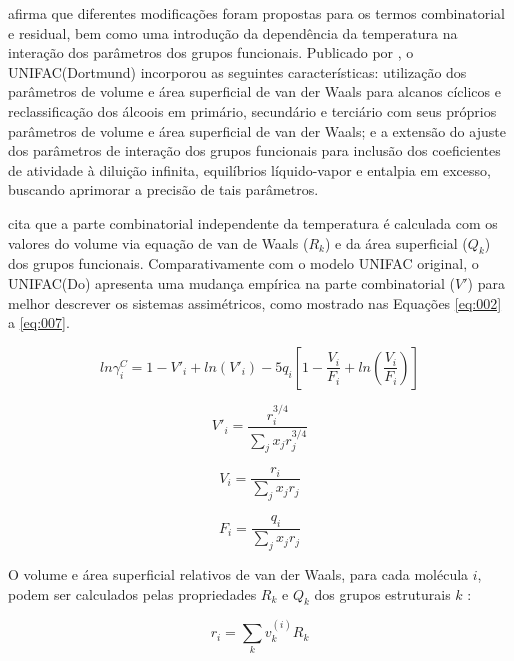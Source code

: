  afirma que diferentes modificações foram propostas para os termos combinatorial e residual, bem como uma introdução da dependência da
 temperatura na interação dos parâmetros dos grupos funcionais. Publicado por , o UNIFAC(Dortmund) incorporou as seguintes características: utilização dos parâmetros de volume e área
 superficial de van der Waals para alcanos cíclicos e reclassificação dos álcoois em primário, secundário e terciário com seus próprios parâmetros
 de volume e área superficial de van der Waals; e a extensão do ajuste dos
 parâmetros de interação dos grupos funcionais para inclusão dos coeficientes de atividade à diluição infinita, equilíbrios líquido-vapor e entalpia em
 excesso, buscando aprimorar a precisão de tais parâmetros.

 cita que a parte combinatorial 
independente da temperatura é
calculada com os valores do volume via equação de van 
de Waals ($R_k$) e da área superficial ($Q_k$) dos grupos funcionais. 
Comparativamente com o modelo UNIFAC original, o UNIFAC(Do)
 apresenta uma mudança empírica na parte combinatorial ($V'$) 
para melhor descrever os sistemas assimétricos, como 
mostrado nas Equações \ref{eq:002} a \ref{eq:007}.

\begin{equation}\label{eq:002}
ln\gamma_i^C = 1 - V'_i + ln(V'_i) - 5q_i\left [ 1
- \frac{V_i}{F_i} + ln\left ( \frac{V_i}{F_i} \right ) \right ]
\end{equation}

\begin{equation}\label{eq:003}
V'_i = \frac{r_i^{3/4}}{\displaystyle\sum_jx_jr_j^{3/4}}
\end{equation}

\begin{equation}\label{eq:004}
V_i = \frac{r_i}{\displaystyle\sum_jx_jr_j}
\end{equation}

\begin{equation}\label{eq:005}
F_i = \frac{q_i}{\displaystyle\sum_jx_jr_j}
\end{equation}

O volume e área superficial relativos de van der Waals, para cada molécula $i$,
podem ser calculados pelas propriedades $R_k$  e $Q_k$  dos grupos estruturais
$k$ :

\begin{equation}\label{eq:006}
r_i = \displaystyle\sum_kv_k^{(i)}R_k
\end{equation}

